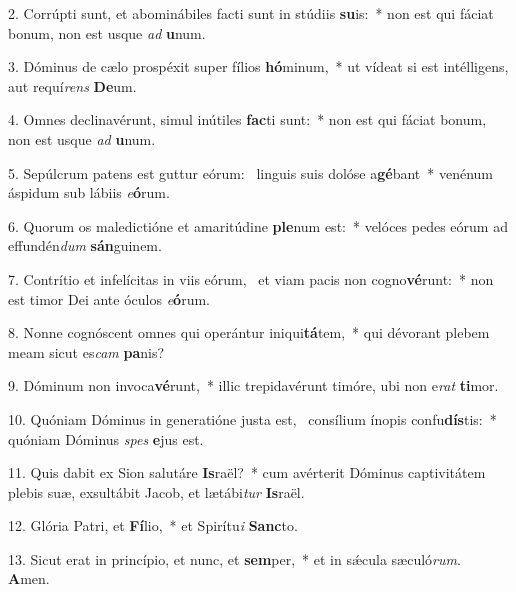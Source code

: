2. Corrúpti sunt, et abominábiles facti sunt in stúdiis \textbf{su}is:~*  non est qui fáciat bonum, non est usque \textit{ad} \textbf{u}num.\

3. Dóminus de cælo prospéxit super fílios \textbf{hó}minum,~*  ut vídeat si est intélligens, aut requí\textit{rens} \textbf{De}um.\

4. Omnes declinavérunt, simul inútiles \textbf{fac}ti sunt:~*  non est qui fáciat bonum, non est usque \textit{ad} \textbf{u}num.\

5. Sepúlcrum patens est guttur eórum: \dag\  linguis suis dolóse a\textbf{gé}bant~*  venénum áspidum sub lábiis \textit{e}\textbf{ó}rum.\

6. Quorum os maledictióne et amaritúdine \textbf{ple}num est:~*  velóces pedes eórum ad effundén\textit{dum} \textbf{sán}guinem.\

7. Contrítio et infelícitas in viis eórum, \dag\  et viam pacis non cogno\textbf{vé}runt:~*  non est timor Dei ante óculos \textit{e}\textbf{ó}rum.\

8. Nonne cognóscent omnes qui operántur iniqui\textbf{tá}tem,~*  qui dévorant plebem meam sicut es\textit{cam} \textbf{pa}nis?\

9. Dóminum non invoca\textbf{vé}runt,~*  illic trepidavérunt timóre, ubi non e\textit{rat} \textbf{ti}mor.\

10. Quóniam Dóminus in generatióne justa est, \dag\  consílium ínopis confu\textbf{dís}tis:~*  quóniam Dóminus \textit{spes} \textbf{e}jus est.\

11. Quis dabit ex Sion salutáre \textbf{Is}raël?~*  cum avérterit Dóminus captivitátem plebis suæ, exsultábit Jacob, et lætábi\textit{tur} \textbf{Is}raël.\

12. Glória Patri, et \textbf{Fí}lio,~*  et Spirítu\textit{i} \textbf{Sanc}to.\

13. Sicut erat in princípio, et nunc, et \textbf{sem}per,~*  et in sǽcula sæculó\textit{rum}. \textbf{A}men.\

